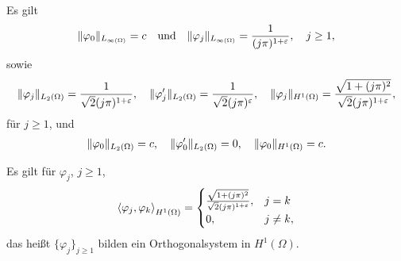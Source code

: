\begin{Lemma}[Normen]
    Es gilt
    \begin{equation}
        \lVert\varphi_{0}\rVert_{L_{\infty(\Omega)}} = c \quad \text{und} \quad \lVert\varphi_{j}\rVert_{L_{\infty(\Omega)}} = \frac{1}{(j \pi)^{1 + \varepsilon}}, \quad j \geq 1,
    \end{equation}
    sowie
    \begin{equation}
        \begin{aligned}
            \lVert\varphi_{j}\rVert_{L_{2}(\Omega)}  = \frac{1}{\sqrt{2}(j \pi)^{1+ \varepsilon}}, \quad
            \lVert\varphi'_{j}\rVert_{L_{2}(\Omega)} = \frac{1}{\sqrt{2}(j \pi)^{\varepsilon}}, \quad
            \lVert\varphi_{j}\rVert_{H^{1}(\Omega)}  = \frac{\sqrt{1 + (j \pi)^{2}}}{\sqrt 2 (j \pi)^{1 + \varepsilon}},
        \end{aligned}
    \end{equation}
    für $j \geq 1$, und
    \begin{equation}
        \begin{aligned}
            \lVert\varphi_{0}\rVert_{L_{2}(\Omega)}  = c, \quad
            \lVert\varphi'_{0}\rVert_{L_{2}(\Omega)} = 0, \quad
            \lVert\varphi_{0}\rVert_{H^{1}(\Omega)}  = c.
        \end{aligned}
    \end{equation}
\end{Lemma}

\begin{Lemma}[Orthogonalität]
    Es gilt für $\varphi_{j}$, $j \geq 1$,
    \begin{equation}
        \left\langle\varphi_{j},\varphi_{k}\right\rangle_{H^{1}(\Omega)} = \begin{cases}
            \frac{\sqrt{1 + (j \pi)^{2}}}{\sqrt 2 (j \pi)^{1 + \varepsilon}},   &j = k \\
            0,          &j \neq k,
        \end{cases}
    \end{equation}
    das heißt $\{ \varphi_{j} \}_{j \geq 1}$ bilden ein Orthogonalsystem in $H^{1}(\Omega)$.
\end{Lemma}

